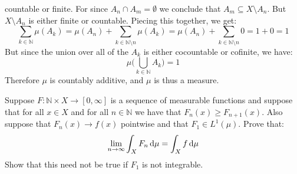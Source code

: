 \documentclass[crop=false,class=article]{standalone}                           %
\begin{document}
\begin{solution}
            countable or finite. For since $A_{n}\cap{A}_{m}=\emptyset$ we
            conclude that $A_{m}\subseteq{X}\setminus{A}_{n}$. But
            $X\setminus{A}_{n}$ is either finite or countable. Piecing this
            together, we get:
            \begin{equation}
                \sum_{k\in\mathbb{N}}\mu(A_{k})
                =\mu(A_{n})+\sum_{k\in\mathbb{N}\setminus{n}}\mu(A_{k})
                =\mu(A_{n})+\sum_{k\in\mathbb{N}\setminus{n}}0
                =1+0
                =1
            \end{equation}
            But since the union over all of the $A_{k}$ is either cocountable or
            cofinite, we have:
            \begin{equation}
                \mu\Big(\bigcup_{k\in\mathbb{N}}A_{k})=1
            \end{equation}
            Therefore $\mu$ is countably additive, and $\mu$ is thus a measure.
        \end{solution}
        \begin{problem}
            Suppose $F:\mathbb{N}\times{X}\rightarrow[0,\infty]$ is a sequence
            of measurable functions and suppose that for all $x\in{X}$ and for
            all $n\in\mathbb{N}$ we have that $F_{n}(x)\geq{F}_{n+1}(x)$. Also
            suppose that $F_{n}(x)\rightarrow{f}(x)$ pointwise and that
            $F_{1}\in{L}^{1}(\mu)$. Prove that:
            \begin{equation}
                \underset{n\rightarrow\infty}{\lim}\int_{X}F_{n}\mathop{}\!\mathrm{d}{\mu}
                =\int_{X}f\mathop{}\!\mathrm{d}{\mu}
            \end{equation}
            Show that this need not be true if $F_{1}$ is not integrable.
        \end{problem}
\end{document}

